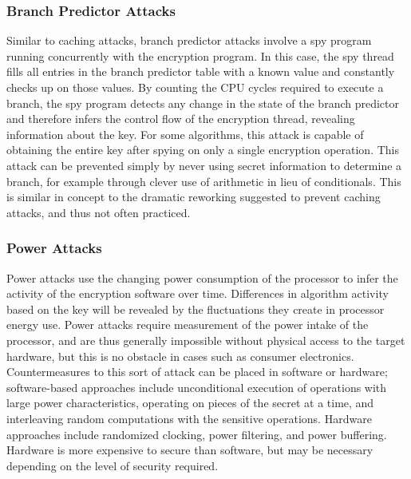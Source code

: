 \documentclass[times, 10pt,twocolumn]{article}
\begin{document}
\subsubsection{Branch Predictor Attacks}
Similar to caching attacks, branch predictor attacks involve a spy program running concurrently with the encryption program.  In this case, the spy thread fills all entries in the branch predictor table with a known value and constantly checks up on those values.  By counting the CPU cycles required to execute a branch, the spy program detects any change in the state of the branch predictor and therefore infers the control flow of the encryption thread, revealing information about the key.  For some algorithms, this attack is capable of obtaining the entire key after spying on only a single encryption operation\cite{branchpredict}.  This attack can be prevented simply by never using secret information to determine a branch, for example through clever use of arithmetic in lieu of conditionals.  This is similar in concept to the dramatic reworking suggested to prevent caching attacks, and thus not often practiced.

\subsubsection{Power Attacks}
Power attacks use the changing power consumption of the processor to infer the activity of the encryption software over time.  Differences in algorithm activity based on the key will be revealed by the fluctuations they create in processor energy use.  Power attacks require measurement of the power intake of the processor, and are thus generally impossible without physical access to the target hardware, but this is no obstacle in cases such as consumer electronics.  Countermeasures to this sort of attack can be placed in software or hardware; software-based approaches include unconditional execution of operations with large power characteristics, operating on pieces of the secret at a time, and interleaving random computations with the sensitive operations.  Hardware approaches include randomized clocking, power filtering, and power buffering.  Hardware is more expensive to secure than software, but may be necessary depending on the level of security required.\cite{mmthesis}
\end{document}
